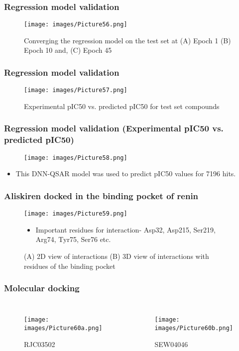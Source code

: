 \documentclass{beamer}
\begin{document}
\begin{frame}
\frametitle{\textbf{Regression model validation}}
\begin{figure}
\texttt{[image: images/Picture56.png]}
\caption{Converging the regression model on the test set at (A) Epoch 1 (B) Epoch 10 and, (C) Epoch 45}
\end{figure}
\end{frame}

\begin{frame}
\frametitle{\textbf{Regression model validation}}
\begin{figure}
\texttt{[image: images/Picture57.png]}
\caption{Experimental pIC50 vs. predicted pIC50 for test set compounds}
\end{figure}
\end{frame}

\begin{frame}
\frametitle{\textbf{Regression model validation (Experimental pIC50 vs. predicted pIC50)}}
\begin{figure}
\texttt{[image: images/Picture58.png]}
\end{figure}
\begin{itemize}
\item This DNN-QSAR model was used to predict pIC50 values for 7196 hits.
\end{itemize}
\end{frame}

\begin{frame}
\frametitle{\textbf{Aliskiren docked in the binding pocket of renin}}
\begin{figure}
\texttt{[image: images/Picture59.png]}
\caption{(A) 2D view of interactions (B) 3D view of interactions with residues of the binding pocket}
\begin{itemize}
\item Important residues for interaction- Asp32, Asp215, Ser219, Arg74, Tyr75, Ser76 etc.
\end{itemize}
\end{figure}
\end{frame}

\begin{frame}
\frametitle{\textbf{Molecular docking}}
\begin{columns}[c] 
\begin{figure}
\texttt{[image: images/Picture60a.png]}
\caption{RJC03502}
\end{figure}
\begin{figure}
\texttt{[image: images/Picture60b.png]}
\caption{SEW04046}
\end{figure}
\end{columns}
\end{frame}
\end{document}
